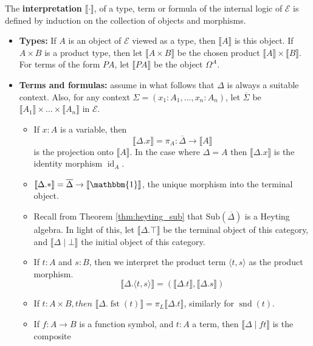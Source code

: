 \documentclass{tac}
\newcommand{\call}[1]{\mathcal{#1}}
\begin{document}
	\begin{definition}
		\label{def:interpretation}
		The \textbf{interpretation} $\llbracket \cdot \rrbracket$, of a type, term or formula of the internal logic of $\call{E}$ is defined by induction on the collection of objects and morphisms.
		\begin{itemize}
			\item \textbf{Types:} If $A$ is an object of $\call{E}$ viewed as a type, then $\llbracket A \rrbracket$ is this object. If $A \times B$ is a product type, then let $\llbracket A \times B \rrbracket$ be the chosen product $\llbracket A \rrbracket \times \llbracket B \rrbracket$. For terms of the form $PA$, let $\llbracket PA \rrbracket$ be the object $\Omega^A$.
			\item \textbf{Terms and formulas:} assume in what follows that $\Delta$ is always a suitable context. Also, for any context $\Sigma = (x_1:A_1,...,x_n:A_n)$, let $\overline{\Sigma}$ be $\llbracket A_1\rrbracket \times ... \times \llbracket A_n\rrbracket$ in $\call{E}$.
			\begin{itemize}
				\item If $x:A$ is a variable, then 
				$$\llbracket \Delta . x\rrbracket = \pi_A: \overline{\Delta} \to \llbracket A\rrbracket$$
				is the projection onto $\llbracket A\rrbracket$. In the case where $\Delta = A$ then $\llbracket \Delta . x\rrbracket$ is the identity morphism $\operatorname{id}_A$.
				\item $\llbracket \Delta . \ast \rrbracket = \overline{\Delta} \to \llbracket\mathbbm{1}\rrbracket$, the unique morphism into the terminal object.
				\item Recall from Theorem \ref{thm:heyting_sub} that $\text{Sub}(\overline{\Delta})$ is a Heyting algebra. In light of this, let $\llbracket \Delta . \top \rrbracket$ be the terminal object of this category, and $\llbracket \Delta \mid \bot \rrbracket$ the initial object of this category.
				\item If $t: A$ and $s: B$, then we interpret the product term $\langle t, s \rangle$ as the product morphism.
				$$\llbracket \Delta . \langle t,s \rangle \rrbracket = ( \llbracket \Delta . t \rrbracket, \llbracket \Delta . s \rrbracket )$$
				\item If $t: A \times B, then $ $\llbracket \Delta . \operatorname{fst}(t)\rrbracket = \pi_L\llbracket\Delta . t \rrbracket$, similarly for $\operatorname{snd}(t)$.
				\item If $f:A \to B$ is a function symbol, and $t:A$ a term, then $\llbracket \Delta \mid ft \rrbracket$ is the composite

\end{itemize}
\end{itemize}
\end{definition}
\end{document}
